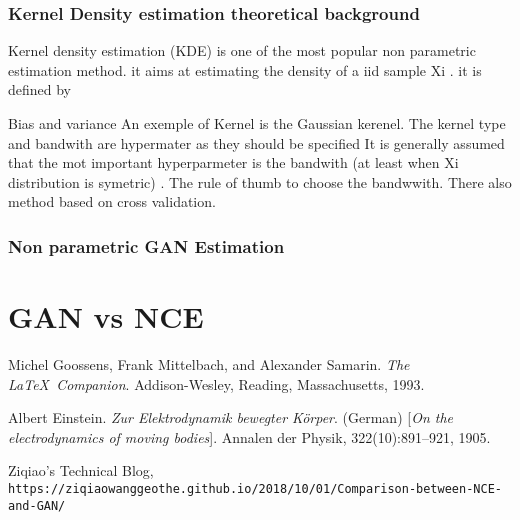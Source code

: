 \documentclass{article}
\begin{document}
\subsubsection{Kernel  Density estimation theoretical background }

Kernel density estimation (KDE) is one of the most popular non parametric estimation method. it aims at estimating the density of a iid sample Xi . it is defined by 

Bias and variance 
An exemple of Kernel is the Gaussian kerenel. The kernel type and bandwith are hypermater as they should be specified
It is generally assumed that the mot important hyperparmeter is the bandwith  (at least when Xi distribution is symetric) .
The rule of thumb to choose the bandwwith. There also method based on cross validation.

\subsubsection{Non parametric GAN Estimation}



\section{GAN vs NCE}



\begin{thebibliography}{9}
Michel Goossens, Frank Mittelbach, and Alexander Samarin. 
\textit{The \LaTeX\ Companion}. 
Addison-Wesley, Reading, Massachusetts, 1993.

Albert Einstein. 
\textit{Zur Elektrodynamik bewegter K{\"o}rper}. (German) 
[\textit{On the electrodynamics of moving bodies}]. 
Annalen der Physik, 322(10):891–921, 1905.

Ziqiao's Technical Blog,
\\\texttt{https://ziqiaowanggeothe.github.io/2018/10/01/Comparison-between-NCE-and-GAN/}
\end{thebibliography}
\end{document}
